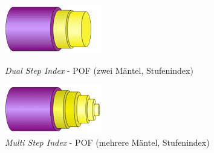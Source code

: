 \begin{figure}[h]
    \begin{center}
        \begin{minipage}[t]{0.4\textwidth}
            \begin{center}
                \includegraphics[height=0.1\textheight]{Bilder/Optische_Wellenleiter_Die_Polymer_Optische_Faser/Brechzahlprofile/pofdsi.png}
                \caption[\textit{Dual Step Index} - POF (zwei Mäntel, Stufenindex) \newline
                \url{http://www.pofac.fh-nuernberg.de/pofac/de/was_sind_pof/images/profil_dsi-pof.png} (zuletzt aufgerufen am 19.09.2015)]{\textit{Dual Step Index} - POF (zwei Mäntel, Stufenindex)}
                \label{fig:pofdsi}
            \end{center}
        \end{minipage}
        \hspace{0.025\textwidth}
        \begin{minipage}[t]{0.4\textwidth}
            \begin{center}
                \includegraphics[height=0.1\textheight]{Bilder/Optische_Wellenleiter_Die_Polymer_Optische_Faser/Brechzahlprofile/pofmsi.png}
                \caption[\textit{Multi Step Index} - POF (mehrere Mäntel, Stufenindex) \newline
                \url{http://www.pofac.fh-nuernberg.de/pofac/de/was_sind_pof/images/profil_msi-pof.png} (zuletzt aufgerufen am 19.09.2015)]{\textit{Multi Step Index} - POF (mehrere Mäntel, Stufenindex)}
                \label{fig:pofmsi}
            \end{center}
        \end{minipage}
    \end{center}


\end{figure}
